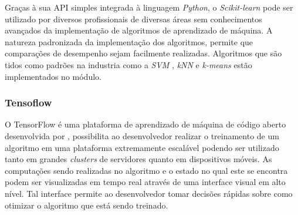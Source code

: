 Graças à sua API simples integrada à linguagem \textit{Python}, o \textit{Scikit-learn} pode ser utilizado por diversos profissionais de diversas áreas sem conhecimentos avançados da implementação de algoritmos de aprendizado de máquina. A natureza padronizada da implementação dos algoritmos, permite que comparações de desempenho sejam facilmente realizadas. Algoritmos que são tidos como padrões na industria como a \textit{SVM} \cite{cortes:1995svm}, \textit{kNN} \cite{cover:1967knn} e \textit{k-means} \cite{macqueen:1967kmeans} estão implementados no módulo. \cite{scikit-learn}



\subsubsection{Tensoflow}

O TensorFlow é uma plataforma de aprendizado de máquina de código aberto desenvolvida por , possibilita ao desenvolvedor realizar o treinamento de um algoritmo em uma plataforma extremamente escalável podendo ser utilizado tanto em grandes \textit{clusters} de servidores quanto em dispositivos móveis. As computações sendo realizadas no algoritmo e o estado no qual este se encontra podem ser visualizadas em tempo real através de uma interface visual em alto nível. Tal interface permite ao desenvolvedor tomar decisões rápidas sobre como otimizar o algoritmo que está sendo treinado.

